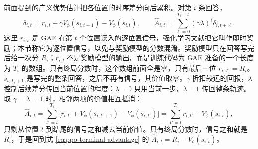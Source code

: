 前面提到的广义优势估计把各位置的时序差分向后累积。对第 \(i\) 条回答，
\begin{equation}
 \delta_{i,t}=r_{i,t}+\gamma V_\phi(s_{i,t+1})-V_\phi(s_{i,t}),\qquad
 \widehat A_{i,t}=\sum_{\ell=0}^{T_i-t}(\gamma\lambda)^\ell\delta_{i,t+\ell}.
 \label{eq:gae}
\end{equation}
这里 \(r_{i,t}\) 是 GAE 在第 \(t\) 个位置读入的逐位置信号，强化学习文献把它叫作即时奖励；本节称它为逐位置信号，以免与奖励模型的分数混淆。奖励模型只在回答写完后给一次分 \(R_i\)；\(r_{i,t}\) 不是奖励模型的输出，而是训练代码为 GAE 准备的一个长度为 \(T_i\) 的数组。只有终局分数时，这个数组前面全是零，只有最后一位 \(r_{i,T_i}=R_i\)。\(s_{i,T_i+1}\) 是写完的整条回答，之后不再有信号，其价值取零。\(\gamma\) 折扣较远的回报，\(\lambda\) 控制后续差分传回当前位置的程度：\(\lambda=0\) 只用当前一步，\(\lambda=1\) 传回整条轨迹。取 \(\gamma=\lambda=1\) 时，相邻两项的价值相互抵消：
\begin{equation}
 \widehat A_{i,t}
 =\sum_{t'=t}^{T_i}\bigl[r_{i,t'}+V_\phi(s_{i,t'+1})-V_\phi(s_{i,t'})\bigr]
 =\sum_{t'=t}^{T_i}r_{i,t'}-V_\phi(s_{i,t}),
 \label{eq:gae-lambda1}
\end{equation}
只剩从位置 \(t\) 到结尾的信号之和减去当前价值。只有终局分数时，信号之和就是 \(R_i\)，于是回到式 \eqref{eq:ppo-terminal-advantage} 的 \(\widehat A_{i,t}=R_i-V_\phi(s_{i,t})\)。

